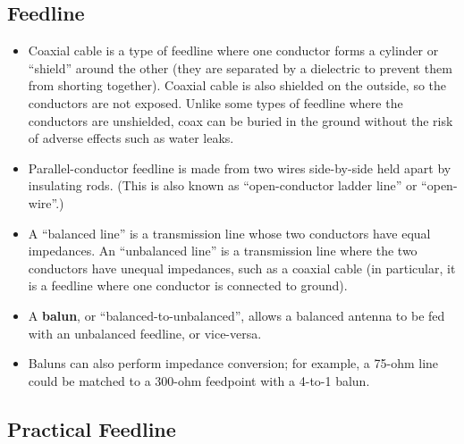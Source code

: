 \documentclass[letterpaper,12pt]{scrartcl}
\begin{document}
\subsection{Feedline}

\begin{itemize}
\item Coaxial cable is a type of feedline where one conductor forms a cylinder or ``shield'' around the other (they are separated by a dielectric to prevent
them from shorting together). Coaxial cable is also shielded on the outside, so the conductors are not exposed. Unlike some types of feedline
where the conductors are unshielded, coax can be buried in the ground without the risk of adverse effects such as water leaks.
\item Parallel-conductor feedline is made from two wires side-by-side held apart by insulating rods.
(This is also known as ``open-conductor ladder line'' or ``open-wire''.)
\item A ``balanced line'' is a transmission line whose two conductors have equal impedances. An ``unbalanced line'' is a transmission line
where the two conductors have unequal impedances, such as a coaxial cable (in particular, it is a feedline where one conductor is connected to ground).
\item A \textbf{balun}, or ``balanced-to-unbalanced'', allows a balanced antenna to be fed with an unbalanced feedline, or vice-versa.
\item Baluns can also perform impedance conversion; for example, a 75-ohm line could be matched to a 300-ohm feedpoint with a 4-to-1 balun.
\end{itemize}

\subsection{Practical Feedline}
\end{document}
